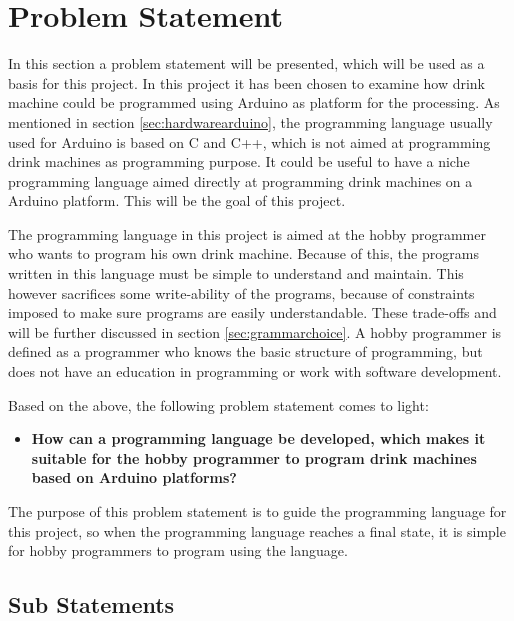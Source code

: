 \section{Problem Statement}
\label{sec:problemstatement}
In this section a problem statement will be presented, which will be used as a basis for this project. In this project it has been chosen to examine how drink machine could be programmed using Arduino as platform for the processing. As mentioned in section \ref{sec:hardwarearduino}, the programming language usually used for Arduino is based on C and C++, which is not aimed at programming drink machines as programming purpose. It could be useful to have a niche programming language aimed directly at programming drink machines on a Arduino platform. This will be the goal of this project.

The programming language in this project is aimed at the hobby programmer who wants to program his own drink machine. Because of this, the programs written in this language must be simple to understand and maintain. This however sacrifices some write-ability of the programs, because of constraints imposed to make sure programs are easily understandable. These trade-offs and will be further discussed in section \ref{sec:grammarchoice}. A hobby programmer is defined as a programmer who knows the basic structure of programming, but does not have an education in programming or work with software development.

Based on the above, the following problem statement comes to light:
\begin{itemize}
	\item \textbf{How can a programming language be developed, which makes it suitable for the hobby programmer to program drink machines based on Arduino platforms?}
\end{itemize}
The purpose of this problem statement is to guide the programming language for this project, so when the programming language reaches a final state, it is simple for hobby programmers to program using the language. 

\subsection{Sub Statements}


